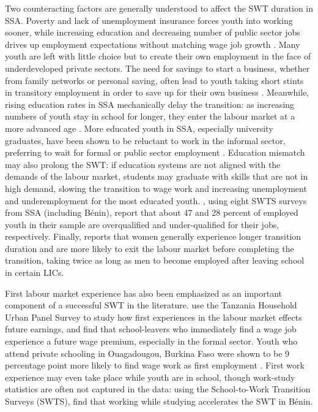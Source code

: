 \documentclass[
  a4paper, twoside, 12pt]{book}
\begin{document}
Two counteracting factors are generally understood to affect the SWT duration in SSA. Poverty and lack of unemployment insurance forces youth into working sooner, while increasing education and decreasing number of public sector jobs drives up employment expectations without matching wage job growth \autocite{manacorda2017}. Many youth are left with little choice but to create their own employment in the face of underdeveloped private sectors. The need for savings to start a business, whether from family networks or personal saving, often lead to youth taking short stints in transitory employment in order to save up for their own business \autocite{bridges2017,frazer2006}. Meanwhile, rising education rates in SSA mechanically delay the transition: as increasing numbers of youth stay in school for longer, they enter the labour market at a more advanced age \autocite{calves2013}. More educated youth in SSA, especially university graduates, have been shown to be reluctant to work in the informal sector, preferring to wait for formal or public sector employment \autocite{serneels2007}. Education mismatch may also prolong the SWT: if education systems are not aligned with the demands of the labour market, students may graduate with skills that are not in high demand, slowing the transition to wage work and increasing unemployment and underemployment for the most educated youth. \textcite{bandara2019}, using eight SWTS surveys from SSA (including Bénin), report that about 47 and 28 percent of employed youth in their sample are overqualified and under-qualified for their jobs, respectively. Finally, \textcite{manacorda2017} reports that women generally experience longer transition duration and are more likely to exit the labour market before completing the transition, taking twice as long as men to become employed after leaving school in certain LICs.

First labour market experience has also been emphasized as an important component of a successful SWT in the literature. \textcite{bridges2017} use the Tanzania Household Urban Panel Survey to study how first experiences in the labour market effects future earnings, and find that school-leavers who immediately find a wage job experience a future wage premium, especially in the formal sector. Youth who attend private schooling in Ouagadougou, Burkina Faso were shown to be 9 percentage point more likely to find wage work as first employment \autocite{calves2013}. First work experience may even take place while youth are in school, though work-study statistics are often not captured in the data: using the School-to-Work Transition Surveys (SWTS), \textcite{dedehouanou2019} find that working while studying accelerates the SWT in Bénin.
\end{document}
